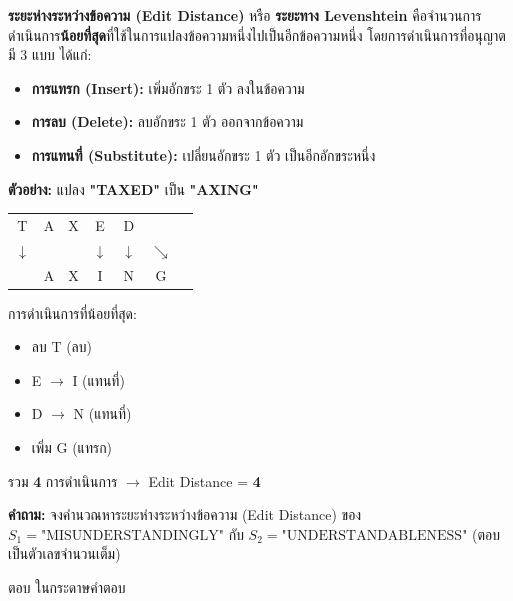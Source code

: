 \question \textbf{ระยะห่างระหว่างข้อความ (Edit Distance)} หรือ \textbf{ระยะทาง Levenshtein} คือจำนวนการดำเนินการ\textbf{น้อยที่สุด}ที่ใช้ในการแปลงข้อความหนึ่งไปเป็นอีกข้อความหนึ่ง โดยการดำเนินการที่อนุญาตมี 3 แบบ ได้แก่:

\begin{itemize}
  \item \textbf{การแทรก (Insert):} เพิ่มอักขระ 1 ตัว ลงในข้อความ
  \item \textbf{การลบ (Delete):} ลบอักขระ 1 ตัว ออกจากข้อความ
  \item \textbf{การแทนที่ (Substitute):} เปลี่ยนอักขระ 1 ตัว เป็นอีกอักขระหนึ่ง
\end{itemize}

\medskip
\textbf{ตัวอย่าง:} แปลง \textbf{"TAXED"} เป็น \textbf{"AXING"}

\begin{center}
\begin{tabular}{ccccccc}
T & A & X & E & D &   &   \\
$\downarrow$ &   &   & $\downarrow$ & $\downarrow$ & $\searrow$ \\
  & A & X & I & N & G &   \\
\end{tabular}
\end{center}

การดำเนินการที่น้อยที่สุด:
\begin{itemize}
  \item ลบ T \hspace{2.5em} (ลบ)
  \item E $\rightarrow$ I \hspace{2em} (แทนที่)
  \item D $\rightarrow$ N \hspace{1.5em} (แทนที่)
  \item เพิ่ม G \hspace{2em} (แทรก)
\end{itemize}
รวม \textbf{4} การดำเนินการ $\rightarrow$ Edit Distance = \textbf{4}

\medskip
\textbf{คำถาม:} จงคำนวณหาระยะห่างระหว่างข้อความ (Edit Distance) ของ \newline
$S_1 = \text{"MISUNDERSTANDINGLY"}$ กับ $S_2 = \text{"UNDERSTANDABLENESS"}$ \newline
(ตอบเป็นตัวเลขจำนวนเต็ม)

\par\medskip
ตอบ ในกระดาษคำตอบ
